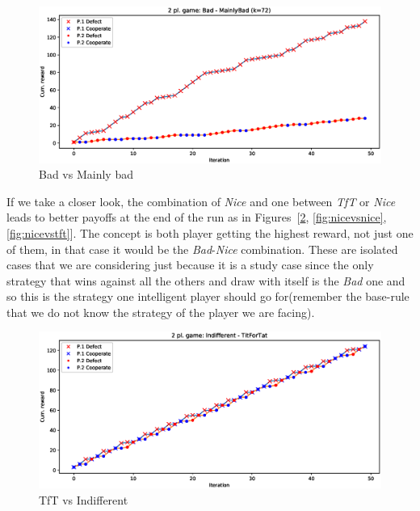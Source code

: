 \documentclass[journal,a4paper,10pt,twoside]{IEEEtran} %
\begin{document}
\begin{figure}[!ht]
    \centering
    \includegraphics[width=1\columnwidth]{../img/ipd2p/ipd2p-rewards-Bad-MainlyBad(k=72)}
    \caption{Bad vs Mainly bad}
    \label{fig:badvsmainlybad}
\end{figure}

If we take a closer look, the combination of \textit{Nice} and one between \textit{TfT} or \textit{Nice} leads to better payoffs at the end of the run as in Figures~[\ref{fig:tftvsindiff}, \ref{fig:nicevsnice}, \ref{fig:nicevstft}]. The concept is both player getting the highest reward, not just one of them, in that case it would be the \textit{Bad}-\textit{Nice} combination. These are isolated cases that we are considering just because it is a study case since the only strategy that wins against all the others and draw with itself is the \textit{Bad} one and so this is the strategy one intelligent player should go for(remember the base-rule that we do not know the strategy of the player we are facing).

\begin{figure}[!ht]
    \centering
    \includegraphics[width=1\columnwidth]{../img/ipd2p/ipd2p-rewards-Indifferent-TitForTat}
    \caption{TfT vs Indifferent}
    \label{fig:tftvsindiff}
\end{figure}
\end{document}
